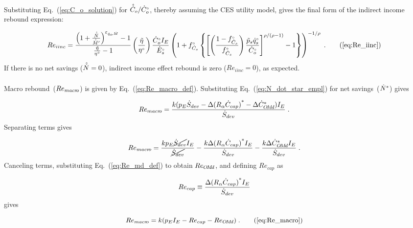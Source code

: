 Substituting Eq.~(\ref{eq:C_o_solution}) 
for $\hat{\dot{C}}_o / {}{\dot{C}}^{\scriptscriptstyle \circ}_o$, 
thereby assuming the CES utility model,
gives the final form 
of the indirect income rebound expression:

\begin{equation}
  Re_{iinc} = \Reiinceqnexact{} \; . \tag{\ref{eq:Re_iinc}}
\end{equation}
%
If there is no net savings ($\hat{\dot{N}} = 0$), 
indirect income effect rebound is zero ($Re_{iinc} = 0$), as expected.


\subsubsection{\Macroeffect{}} 
\label{sec:Re_macro}

Macro rebound~($Re_{macr\!o}$) is given by Eq.~(\ref{eq:Re_macro_def}).
Substituting Eq.~(\ref{eq:N_dot_star_empl}) for net savings~(${\dot{N}}^*$) gives

\begin{equation}
  Re_{macr\!o} = \frac{k (p_E \dot{S}_{dev} - \Delta {(R_\alpha \dot{C}_{cap})}^* - \Delta {\dot{C}}^*_{O\!M\!d}) I_E}{\dot{S}_{dev}} \; .
\end{equation}
%
Separating terms gives

\begin{equation}
  Re_{macr\!o} = \frac{k p_E \cancel{\dot{S}_{dev}} I_E}{\cancel{\dot{S}_{dev}}}
                                - \frac{k \Delta {(R_\alpha  \dot{C}_{cap})}^* I_E}{\dot{S}_{dev}}
                                - \frac{k \Delta {\dot{C}}^*_{O\!M\!d} I_E}{\dot{S}_{dev}} \; .
\end{equation}
%
Canceling terms, substituting Eq.~(\ref{eq:Re_md_def}) to obtain $Re_{O\!M\!d}$, and
defining $Re_{cap}$ as

\begin{equation} \label{eq:Re_cap}
  Re_{cap} \equiv \frac{\Delta {(R_\alpha \dot{C}_{cap})}^* I_E}{\dot{S}_{dev}}{}
\end{equation}
%
gives

\begin{equation}
  Re_{\macro} = \Remacroeqn{} \; . \tag{\ref{eq:Re_macro}}
\end{equation}


